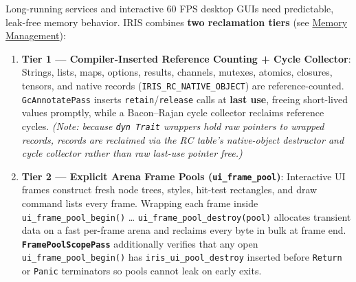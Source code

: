 \documentclass[
  english,
  oneside]{book}
\begin{document}
Long-running services and interactive 60 FPS desktop GUIs need
predictable, leak-free memory behavior. IRIS combines \textbf{two
reclamation tiers} (see \href{memory-management.md}{Memory Management}):

\begin{enumerate}
\def\labelenumi{\arabic{enumi}.}
\item
  \textbf{Tier 1 --- Compiler-Inserted Reference Counting + Cycle
  Collector}: Strings, lists, maps, options, results, channels, mutexes,
  atomics, closures, tensors, and native records
  (\texttt{IRIS\_RC\_NATIVE\_OBJECT}) are reference-counted.
  \texttt{GcAnnotatePass} inserts \texttt{retain}/\texttt{release} calls
  at \textbf{last use}, freeing short-lived values promptly, while a
  Bacon--Rajan cycle collector reclaims reference cycles. \emph{(Note:
  because \texttt{dyn\ Trait} wrappers hold raw pointers to wrapped
  records, records are reclaimed via the RC table's native-object
  destructor and cycle collector rather than raw last-use pointer
  free.)}
\item
  \textbf{Tier 2 --- Explicit Arena Frame Pools
  (\texttt{ui\_frame\_pool})}: Interactive UI frames construct fresh
  node trees, styles, hit-test rectangles, and draw command lists every
  frame. Wrapping each frame inside \texttt{ui\_frame\_pool\_begin()}
  \ldots{} \texttt{ui\_frame\_pool\_destroy(pool)} allocates transient
  data on a fast per-frame arena and reclaims every byte in bulk at
  frame end. \textbf{\texttt{FramePoolScopePass}} additionally verifies
  that any open \texttt{ui\_frame\_pool\_begin()} has
  \texttt{iris\_ui\_pool\_destroy} inserted before \texttt{Return} or
  \texttt{Panic} terminators so pools cannot leak on early exits.
\end{enumerate}
\end{document}
